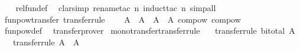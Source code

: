\begin{isabellebody}
%
\isadelimproof
\ \ %
\endisadelimproof
%
\isatagproof
{}\isamarkupfalse%
\ rel{\isacharunderscore}{\kern0pt}fun{\isacharunderscore}{\kern0pt}def\ \isamarkupfalse%
\ {\isacharparenleft}{\kern0pt}clarsimp{\isacharcomma}{\kern0pt}\ rename{\isacharunderscore}{\kern0pt}tac\ n{\isacharcomma}{\kern0pt}\ induct{\isacharunderscore}{\kern0pt}tac\ n{\isacharcomma}{\kern0pt}\ simp{\isacharunderscore}{\kern0pt}all{\isacharparenright}{\kern0pt}%
\endisatagproof
{\isafoldproof}%
%
\isadelimproof
\isanewline
%
\endisadelimproof
\isanewline
{}\isamarkupfalse%
\ funpow{\isacharunderscore}{\kern0pt}transfer\ {\isacharbrackleft}{\kern0pt}transfer{\isacharunderscore}{\kern0pt}rule{\isacharbrackright}{\kern0pt}{\isacharcolon}{\kern0pt}\isanewline
\ \ {\isachardoublequoteopen}{\isacharparenleft}{\kern0pt}{\isacharparenleft}{\kern0pt}{\isacharequal}{\kern0pt}{\isacharparenright}{\kern0pt}\ {\isacharequal}{\kern0pt}{\isacharequal}{\kern0pt}{\isacharequal}{\kern0pt}{\isachargreater}{\kern0pt}\ {\isacharparenleft}{\kern0pt}A\ {\isacharequal}{\kern0pt}{\isacharequal}{\kern0pt}{\isacharequal}{\kern0pt}{\isachargreater}{\kern0pt}\ A{\isacharparenright}{\kern0pt}\ {\isacharequal}{\kern0pt}{\isacharequal}{\kern0pt}{\isacharequal}{\kern0pt}{\isachargreater}{\kern0pt}\ {\isacharparenleft}{\kern0pt}A\ {\isacharequal}{\kern0pt}{\isacharequal}{\kern0pt}{\isacharequal}{\kern0pt}{\isachargreater}{\kern0pt}\ A{\isacharparenright}{\kern0pt}{\isacharparenright}{\kern0pt}\ compow\ compow{\isachardoublequoteclose}\isanewline
%
\isadelimproof
\ \ %
\endisadelimproof
%
\isatagproof
{}\isamarkupfalse%
\ funpow{\isacharunderscore}{\kern0pt}def\ \isamarkupfalse%
\ transfer{\isacharunderscore}{\kern0pt}prover%
\endisatagproof
{\isafoldproof}%
%
\isadelimproof
\isanewline
%
\endisadelimproof
\isanewline
{}\isamarkupfalse%
\ mono{\isacharunderscore}{\kern0pt}transfer{\isacharbrackleft}{\kern0pt}transfer{\isacharunderscore}{\kern0pt}rule{\isacharbrackright}{\kern0pt}{\isacharcolon}{\kern0pt}\isanewline
\ \ \ {\isacharbrackleft}{\kern0pt}transfer{\isacharunderscore}{\kern0pt}rule{\isacharbrackright}{\kern0pt}{\isacharcolon}{\kern0pt}\ {\isachardoublequoteopen}bi{\isacharunderscore}{\kern0pt}total\ A{\isachardoublequoteclose}\isanewline
\ \ \ {\isacharbrackleft}{\kern0pt}transfer{\isacharunderscore}{\kern0pt}rule{\isacharbrackright}{\kern0pt}{\isacharcolon}{\kern0pt}\ {\isachardoublequoteopen}{\isacharparenleft}{\kern0pt}A\ {\isacharequal}{\kern0pt}{\isacharequal}{\kern0pt}{\isacharequal}{\kern0pt}{\isachargreater}{\kern0pt}\ A\ {\isacharequal}{\kern0pt}{\isacharequal}{\kern0pt}{\isacharequal}{\kern0pt}{\isachargreater}{\kern0pt}\ {\isacharparenleft}{\kern0pt}{\isacharequal}{\kern0pt}{\isacharparenright}{\kern0pt}{\isacharparenright}{\kern0pt}\ {\isacharparenleft}{\kern0pt}{\isasymle}{\isacharparenright}{\kern0pt}\ {\isacharparenleft}{\kern0pt}{\isasymle}{\isacharparenright}{\kern0pt}{\isachardoublequoteclose}\isanewline

\end{isabellebody}
